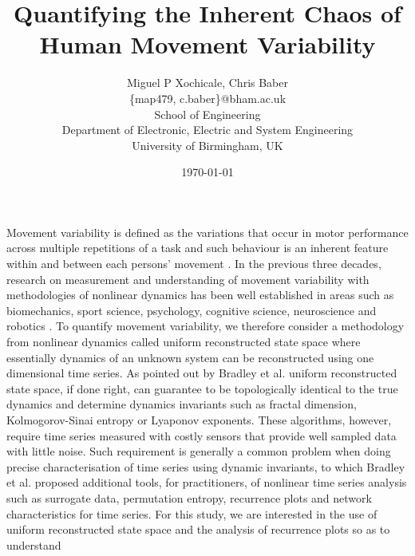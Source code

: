 \documentclass[10pt]{article}
\author{Miguel P Xochicale, Chris Baber \\
\{map479, c.baber\}@bham.ac.uk \\
School of Engineering\\
Department of Electronic, Electric and System Engineering\\
University of Birmingham, UK}
\title{Quantifying the Inherent Chaos of \\ Human Movement Variability}
\date{\today}
\begin{document}
\maketitle


Movement variability is defined as the variations that occur in motor
performance across multiple repetitions of a task and such behaviour is an 
inherent feature within and between each persons' movement \cite{tlockhart2013}.
In the previous three decades, research on measurement and understanding of
movement variability with methodologies of nonlinear dynamics has been well established 
in areas such as biomechanics, sport science, psychology, cognitive science, 
neuroscience and robotics \cite{stergiou2011,harbourne2009}.
To quantify movement variability, we therefore consider a methodology from nonlinear dynamics
called uniform reconstructed state space where essentially dynamics of
an unknown system can be reconstructed using one dimensional time series.
As pointed out by Bradley et al. \cite{bradley2015} uniform reconstructed state space,
if done right, can guarantee to be topologically identical to the true dynamics
and determine dynamics invariants such as fractal dimension, Kolmogorov-Sinai
entropy or Lyaponov exponents.
These algorithms, however, require time series measured with costly sensors 
that provide well sampled data with little noise.
Such requirement is generally a common problem when doing precise
characterisation of time series using dynamic invariants,
to which Bradley et al. \cite{bradley2015} proposed additional tools,
for practitioners, of nonlinear time series analysis such as surrogate data, 
permutation entropy, recurrence plots and network characteristics for time series.
For this study, we are interested in the use of uniform reconstructed
state space and the analysis of recurrence plots so as to understand 
\end{document}
